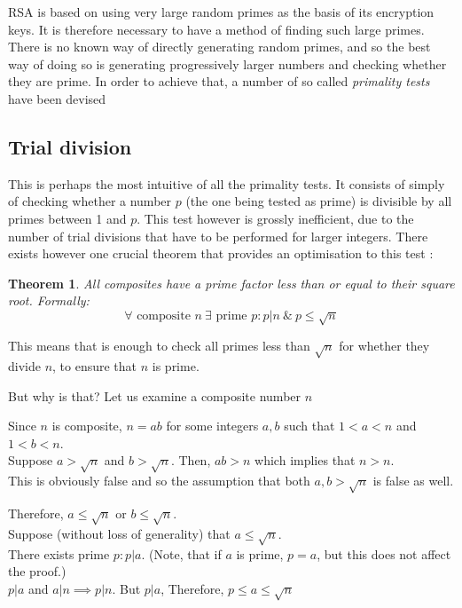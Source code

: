 \documentclass[12pt, titlepage]{article}
\newtheorem{theorem}{Theorem}
\begin{document}
RSA is based on using very large random primes as the basis of its encryption keys. It is
therefore necessary to have a method of finding such large primes. There is no known way of
directly generating random primes, and so the best way of doing so is generating
progressively larger numbers and checking whether they are prime. In order to achieve that,
a number of so called \emph{primality tests} have been devised  

\subsection{Trial division}

This is perhaps the most intuitive of all the primality tests. It consists of simply of
checking whether a number $p$ (the one being tested as prime) is divisible by all primes
between 1 and $p$. This test however is grossly inefficient, due to the number of trial
divisions that have to be performed for larger integers. There exists however one crucial
theorem that provides an optimisation to this test \autocite[276]{haese_ib_options}:
%
\begin{theorem} \label{th:prime_factors_less_than_root}
    All composites have a prime factor less than or equal to their square
    root. Formally:\\
    $$\forall \text{ composite } n \: \exists \text{ prime } p:p|n \: \& \: p \leq \sqrt{n}$$
\end{theorem}
%
%
This means that is enough to check all primes less than $\sqrt{n}$ for whether they divide
$n$, to ensure that $n$ is prime. 

But why is that? Let us examine a composite number $n$

Since $n$ is composite, $n=ab$ for some integers $a, b$ such that $1<a<n$ and $1<b<n$.\\
Suppose $a>\sqrt{n}$ and $b>\sqrt{n}$. Then, $ab>n$ which implies that $n>n$. \\
This is obviously false and so the assumption that both $a,b > \sqrt{n}$ is false as well.

Therefore, $a \leq \sqrt{n}$ or $b \leq \sqrt{n}$. \\
Suppose (without loss of generality) that $a \leq \sqrt{n}$.\\
There exists prime $p: p|a$. (Note, that if $a$ is prime, $p = a$, but this does not
affect the proof.)\\
$p|a$ and $a|n \implies p|n$. But $p|a$, Therefore,  $p \leq a \leq \sqrt{n}$\\
\end{document}
